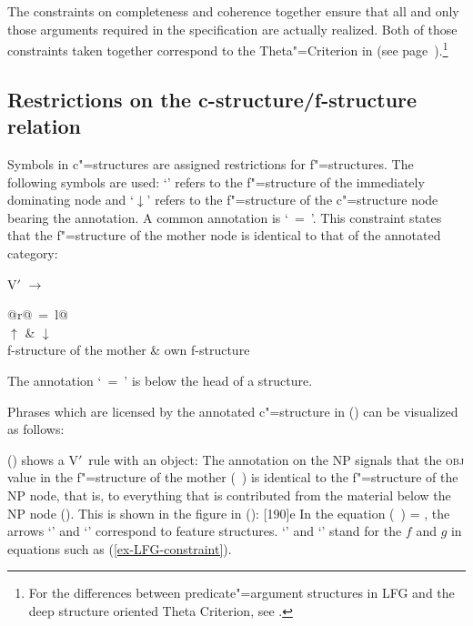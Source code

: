 \noindent
The constraints on completeness and coherence together ensure that all and only those arguments required in
the \lfgpred{} specification are actually realized.
Both of those constraints taken together correspond to the Theta"=Criterion in \gbt (see
page~\pageref{theta-Kriterium}).\footnote{%
For the differences between predicate"=argument structures in LFG and the deep structure oriented Theta Criterion, see .} 

\subsection{Restrictions on the c-structure/f-structure relation}

\largerpage
Symbols in c"=structures are assigned restrictions for f"=structures. The
following symbols are used: `\up'\is{$\uparrow$} refers to the f"=structure of the immediately
dominating node and `$\downarrow$'\is{$\downarrow$} refers to the f"=structure of the c"=structure
node bearing the annotation. A common annotation is `\up~=~\down'. This constraint states that the
f"=structure of the mother node is identical to that of the annotated category: 

\ea
V$'$ $\to$ \begin{tabular}[t]{@{}r@{~=~}l@{}}
           \\
           $\uparrow$ &  $\downarrow$\\ 
           f-structure of the mother & own f-structure\\
           \end{tabular}
\z
The annotation `\up~=~\down' is below the head of a structure.

Phrases which are licensed by the annotated c"=structure in () can be visualized as follows:
\ea
{}%
\hspace*{3em}%
\z

\noindent
() shows a V$'$~rule with an object:
\ea
{}
\z
%
The annotation on the NP signals that the \textsc{obj} value in the f"=structure of the mother
\mbox{(\up\ \lfgobj)} is identical to the f"=structure of the NP node, that is, to everything that is
contributed from the material below the NP node (\down). 
This is shown in the figure in ():
\ea
{}%
\hspace*{3em}%
[190]{e}
\z
In the equation (\up\ \lfgobj) = \down{},  the arrows `\up' and `\down' correspond to feature structures. `\up' and
`\down' stand for the $f$ and $g$ in equations such as (\ref{ex-LFG-constraint}).


